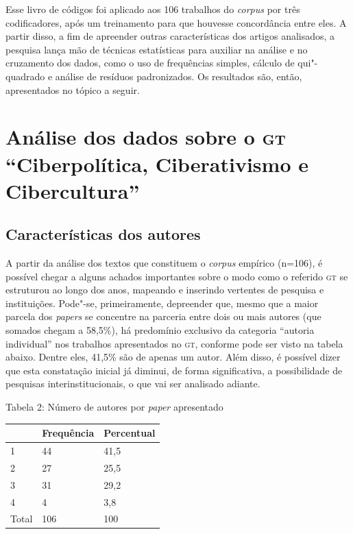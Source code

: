 Esse livro de códigos foi aplicado aos 106 trabalhos do \emph{corpus}
por três codificadores, após um treinamento para que houvesse
concordância entre eles. A partir disso, a fim de apreender outras
características dos artigos analisados, a pesquisa lança mão de técnicas
estatísticas para auxiliar na análise e no cruzamento dos dados, como o
uso de frequências simples, cálculo de qui"-quadrado e análise de
resíduos padronizados. Os resultados são, então, apresentados no tópico
a seguir.

\section{Análise dos dados sobre o \textsc{gt} ``Ciberpolítica, Ciberativismo e
Cibercultura''}

\subsection{Características dos autores}

A partir da análise dos textos que constituem o \emph{corpus} empírico
(n=106), é possível chegar a alguns achados importantes sobre o modo
como o referido \textsc{gt} se estruturou ao longo dos anos, mapeando e inserindo
vertentes de pesquisa e instituições. Pode"-se, primeiramente, depreender
que, mesmo que a maior parcela dos \emph{papers} se concentre na
parceria entre dois ou mais autores (que somados chegam a 58,5\%), há
predomínio exclusivo da categoria ``autoria individual'' nos trabalhos
apresentados no \textsc{gt}, conforme pode ser visto na tabela abaixo. Dentre
eles, 41,5\% são de apenas um autor. Além disso, é possível dizer
que esta constatação inicial já diminui, de forma significativa, a
possibilidade de pesquisas interinstitucionais, o que vai ser analisado
adiante.

\begin{center}
Tabela 2: Número de autores por \emph{paper} apresentado
\end{center}

\begin{center}
\centering
\begin{tabular}{|l|l|l|}
\hline
 & Frequência & Percentual \\ \hline
1 & 44 & 41,5 \\ \hline
2 & 27 & 25,5 \\ \hline
3 & 31 & 29,2 \\ \hline
4 & 4 & 3,8 \\ \hline
Total & 106 & 100 \\ \hline
\end{tabular}
\end{center}


